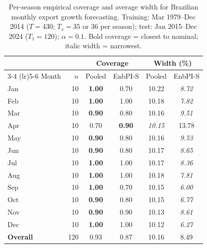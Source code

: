\begin{table}[ht]
\centering
\caption{Per-season empirical coverage and average width for Brazilian monthly export growth forecasting.
Training: Mar 1979--Dec 2014 ($T=430$; $T_s = 35$ or $36$ per season); test: Jan 2015--Dec 2024 ($T_1=120$); $\alpha=0.1$.
Bold coverage = closest to nominal; italic width = narrowest.}
\label{tab:empirical_exports_coverage}
\begin{tabular}{l r cc cc}
\toprule
 & & \multicolumn{2}{c}{Coverage} & \multicolumn{2}{c}{Width (\%)} \\
\cmidrule(lr){3-4} \cmidrule(lr){5-6}
Month & $n$ & Pooled & EnbPI-S & Pooled & EnbPI-S \\
\midrule
Jan & 10 & \textbf{1.00} & 0.70 & 10.22 & \textit{8.72} \\
Feb & 10 & \textbf{1.00} & 1.00 & 10.18 & \textit{7.82} \\
Mar & 10 & \textbf{0.90} & 0.80 & 10.16 & \textit{9.51} \\
Apr & 10 & 0.70 & \textbf{0.90} & \textit{10.15} & 13.78 \\
May & 10 & \textbf{0.90} & 0.80 & 10.16 & \textit{9.53} \\
Jun & 10 & \textbf{0.90} & 0.80 & 10.17 & \textit{8.65} \\
Jul & 10 & \textbf{1.00} & 1.00 & 10.17 & \textit{8.36} \\
Aug & 10 & \textbf{1.00} & 1.00 & 10.18 & \textit{7.81} \\
Sep & 10 & \textbf{1.00} & 0.70 & 10.15 & \textit{6.00} \\
Oct & 10 & \textbf{0.90} & 0.80 & 10.15 & \textit{6.77} \\
Nov & 10 & \textbf{0.90} & 0.90 & 10.13 & \textit{8.61} \\
Dec & 10 & \textbf{1.00} & 1.00 & 10.12 & \textit{6.27} \\
\midrule
\textbf{Overall} & 120 & 0.93 & 0.87 & 10.16 & 8.49 \\
\bottomrule
\end{tabular}
\end{table}